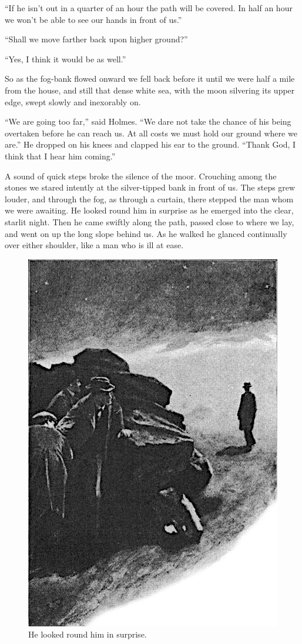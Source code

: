 \documentclass[paper=a5,BCOR=7mm,twoside,DIV=calc,12pt,usegeometry,openany,chapterprefix,endperiod,headings=big]{scrbook} %
\begin{document}
\enquote{If he isn't out in a quarter of an hour the path will be covered. In half an hour we won't be able to see our hands in front of us.}

\enquote{Shall we move farther back upon higher ground?}

\enquote{Yes, I think it would be as well.}

So as the fog-bank flowed onward we fell back before it until we were half a mile from the house, and still that dense white sea, with the moon silvering its upper edge, swept slowly and inexorably on.

\enquote{We are going too far,} said Holmes. \enquote{We dare not take the chance of his being overtaken before he can reach us. At all costs we must hold our ground where we are.} He dropped on his knees and clapped his ear to the ground. \enquote{Thank God, I think that I hear him coming.}

A sound of quick steps broke the silence of the moor. Crouching among the stones we stared intently at the silver-tipped bank in front of us. The steps grew louder, and through the fog, as through a curtain, there stepped the man whom we were awaiting. He looked round him in surprise as he emerged into the clear, starlit night. Then he came swiftly along the path, passed close to where we lay, and went on up the long slope behind us. As he walked he glanced continually over either shoulder, like a man who is ill at ease.

\begin{figure}[tbph]
\centering
\includegraphics[width=.8\linewidth]{14_lookedround}
\caption{He looked round him in surprise.}
\end{figure}
\end{document}
